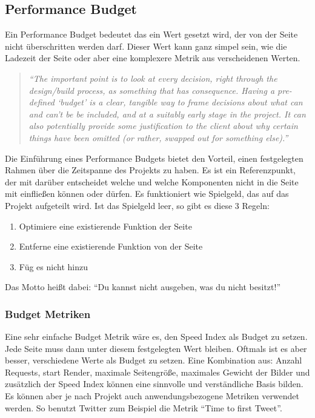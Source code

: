 	



		\subsection{Performance Budget} %
		\label{sub:performance_budget}
			Ein Performance Budget bedeutet das ein Wert gesetzt wird, der von der Seite nicht überschritten werden darf. Dieser Wert kann ganz simpel sein, wie die Ladezeit der Seite oder aber eine komplexere Metrik aus verscheidenen Werten.

			\begin{quote}
				\textit{"`The important point is to look at every decision, right through the design/build process, as something that has consequence. Having a pre-defined ‘budget’ is a clear, tangible way to frame decisions about what can and can’t be be included, and at a suitably early stage in the project. It can also potentially provide some justification to the client about why certain things have been omitted (or rather, swapped out for something else)."'}
			\end{quote}

			Die Einführung eines Performance Budgets bietet den Vorteil, einen festgelegten Rahmen über die Zeitspanne des Projekts zu haben. Es ist ein Referenzpunkt, der mit darüber entscheidet welche und welche Komponenten nicht in die Seite mit einfließen können oder dürfen. Es funktioniert wie Spielgeld, das auf das Projekt aufgeteilt wird. Ist das Spielgeld leer, so gibt es diese 3 Regeln:
			\begin{enumerate}
				\item Optimiere eine existierende Funktion der Seite
				\item Entferne eine existierende Funktion von der Seite
				\item Füg es nicht hinzu
			\end{enumerate}
			Das Motto heißt dabei: "`Du kannst nicht ausgeben, was du nicht besitzt!"'

			\subsubsection{Budget Metriken} %
			\label{ssub:Budget_metriken}
				
				Eine sehr einfache Budget Metrik wäre es, den Speed Index als Budget zu setzen. Jede Seite muss dann unter diesem festgelegten Wert bleiben. Oftmals ist es aber besser, verschiedene Werte als Budget zu setzen. Eine Kombination aus: Anzahl Requests, start Render, maximale Seitengröße, maximales Gewicht der Bilder und zusätzlich der Speed Index können eine sinnvolle und verständliche Basis bilden. Es können aber je nach Projekt auch anwendungsbezogene Metriken verwendet werden. So benutzt Twitter zum Beispiel die Metrik "`Time to first Tweet"'.

